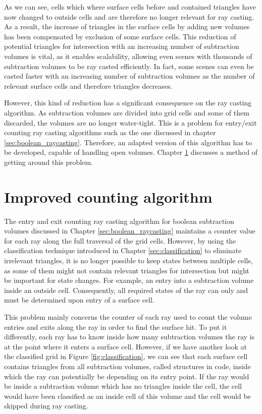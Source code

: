 As we can see, cells which where surface cells before and contained triangles have now changed to outside cells and are therefore no longer relevant for ray casting. As a result, the increase of triangles in the surface cells by adding new volumes has been compensated by exclusion of some surface cells. This reduction of potential triangles for intersection with an increasing number of subtraction volumes is vital, as it enables scalability, allowing even scenes with thousands of subtraction volumes to be ray casted efficiently. In fact, some scenes can even be casted faster with an increasing number of subtraction volumes as the number of relevant surface cells and therefore triangles decreases.

However, this kind of reduction has a significant consequence on the ray casting algorithm. As subtraction volumes are divided into grid cells and some of them discarded, the volumes are no longer water-tight. This is a problem for entry/exit counting ray casting algorithms such as the one discussed in chapter \ref{sec:boolean_raycasting}. Therefore, an adapted version of this algorithm has to be developed, capable of handling open volumes. Chapter \ref{sec:adapted_ray_casting} discusses a method of getting around this problem.


\section{Improved counting algorithm}
\label{sec:adapted_ray_casting}

The entry and exit counting ray casting algorithm for boolean subtraction volumes discussed in Chapter \ref{sec:boolean_raycasting} maintains a counter value for each ray along the full traversal of the grid cells. However, by using the classification technique introduced in Chapter \ref{sec:classification} to eliminate irrelevant triangles, it is no longer possible to keep states between multiple cells, as some of them might not contain relevant triangles for intersection but might be important for state changes. For example, an entry into a subtraction volume inside an outside cell. Consequently, all required states of the ray can only and must be determined upon entry of a surface cell.

This problem mainly concerns the counter of each ray used to count the volume entries and exits along the ray in order to find the surface hit. To put it differently, each ray has to know inside how many subtraction volumes the ray is at the point where it enters a surface cell. However, if we have another look at the classified grid in Figure \ref{fig:classification}, we can see that each surface cell contains triangles from all subtraction volumes, called structures in code, inside which the ray can potentially be depending on its entry point. If the ray would be inside a subtraction volume which has no triangles inside the cell, the cell would have been classified as an inside cell of this volume and the cell would be skipped during ray casting.

